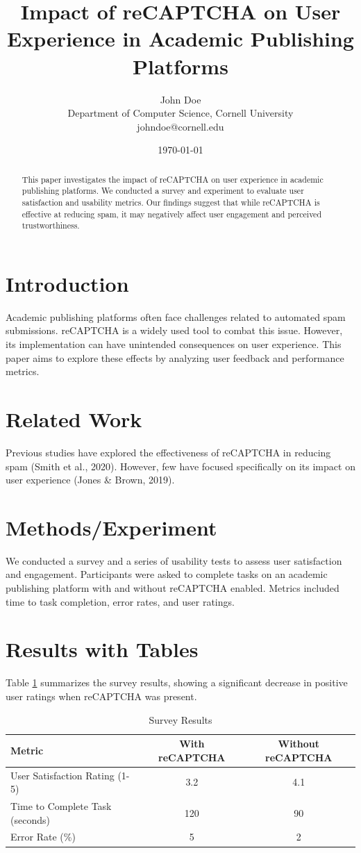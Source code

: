 \documentclass{article}
\title{Impact of reCAPTCHA on User Experience in Academic Publishing Platforms}
\author{John Doe \\
Department of Computer Science, Cornell University \\ 
johndoe@cornell.edu}
\date{\today}
\begin{document}
\maketitle

\begin{abstract}
This paper investigates the impact of reCAPTCHA on user experience in academic publishing platforms. We conducted a survey and experiment to evaluate user satisfaction and usability metrics. Our findings suggest that while reCAPTCHA is effective at reducing spam, it may negatively affect user engagement and perceived trustworthiness.
\end{abstract}

\section{Introduction}
Academic publishing platforms often face challenges related to automated spam submissions. reCAPTCHA is a widely used tool to combat this issue. However, its implementation can have unintended consequences on user experience. This paper aims to explore these effects by analyzing user feedback and performance metrics.

\section{Related Work}
Previous studies have explored the effectiveness of reCAPTCHA in reducing spam (Smith et al., 2020). However, few have focused specifically on its impact on user experience (Jones & Brown, 2019).

\section{Methods/Experiment}
We conducted a survey and a series of usability tests to assess user satisfaction and engagement. Participants were asked to complete tasks on an academic publishing platform with and without reCAPTCHA enabled. Metrics included time to task completion, error rates, and user ratings.

\section{Results with Tables}
Table \ref{table:survey_results} summarizes the survey results, showing a significant decrease in positive user ratings when reCAPTCHA was present.

\begin{table}[ht]
\centering
\caption{Survey Results}
\label{table:survey_results}
\begin{tabular}{lcc}
\toprule
Metric & With reCAPTCHA & Without reCAPTCHA \\
\midrule
User Satisfaction Rating (1-5) & 3.2 & 4.1 \\
Time to Complete Task (seconds) & 120 & 90 \\
Error Rate (\%) & 5 & 2 \\
\bottomrule
\end{tabular}
\end{table}
\end{document}
